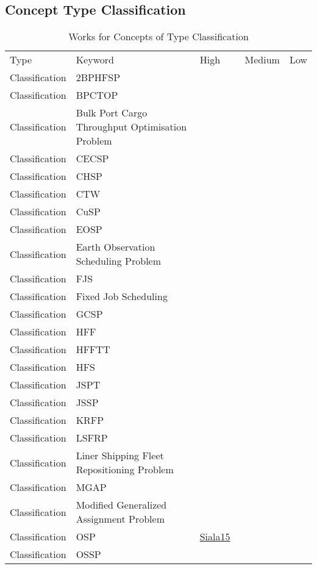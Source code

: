 \clearpage
\subsection{Concept Type Classification}
\label{sec:Classification}
{\scriptsize
\begin{longtable}{lp{3cm}>{\raggedright\arraybackslash}p{6cm}>{\raggedright\arraybackslash}p{6cm}>{\raggedright\arraybackslash}p{8cm}}
\rowcolor{white}\caption{Works for Concepts of Type Classification}\\ \toprule
\rowcolor{white}Type & Keyword & High & Medium & Low\\ \midrule\endhead
\bottomrule
\endfoot
Classification & 2BPHFSP &  &  & \\
Classification & BPCTOP &  &  & \\
Classification & Bulk Port Cargo Throughput Optimisation Problem &  &  & \\
Classification & CECSP &  &  & \\
Classification & CHSP &  &  & \\
Classification & CTW &  &  & \\
Classification & CuSP &  &  & \\
Classification & EOSP &  &  & \\
Classification & Earth Observation Scheduling Problem &  &  & \\
Classification & FJS &  &  & \\
Classification & Fixed Job Scheduling &  &  & \\
Classification & GCSP &  &  & \\
Classification & HFF &  &  & \\
Classification & HFFTT &  &  & \\
Classification & HFS &  &  & \\
Classification & JSPT &  &  & \\
Classification & JSSP &  &  & \\
Classification & KRFP &  &  & \\
Classification & LSFRP &  &  & \\
Classification & Liner Shipping Fleet Repositioning Problem &  &  & \\
Classification & MGAP &  &  & \\
Classification & Modified Generalized Assignment Problem &  &  & \\
Classification & OSP & \href{cars/works/Siala15.pdf}{Siala15}~\cite{Siala15} &  & \\
Classification & OSSP &  &  & \\

\end{longtable}}
